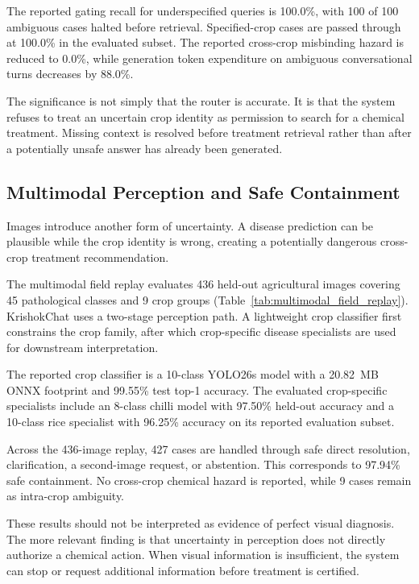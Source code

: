 \documentclass[a4paper,fleqn]{cas-dc}
\begin{document}
The reported gating recall for underspecified queries is 100.0\%, with 100 of 100 ambiguous cases halted before retrieval. Specified-crop cases are passed through at 100.0\% in the evaluated subset. The reported cross-crop misbinding hazard is reduced to 0.0\%, while generation token expenditure on ambiguous conversational turns decreases by 88.0\%.

The significance is not simply that the router is accurate. It is that the system refuses to treat an uncertain crop identity as permission to search for a chemical treatment. Missing context is resolved before treatment retrieval rather than after a potentially unsafe answer has already been generated.

\subsection{Multimodal Perception and Safe Containment}

Images introduce another form of uncertainty. A disease prediction can be plausible while the crop identity is wrong, creating a potentially dangerous cross-crop treatment recommendation.

The multimodal field replay evaluates 436 held-out agricultural images covering 45 pathological classes and 9 crop groups (Table~\ref{tab:multimodal_field_replay}). KrishokChat uses a two-stage perception path. A lightweight crop classifier first constrains the crop family, after which crop-specific disease specialists are used for downstream interpretation.

The reported crop classifier is a 10-class YOLO26s model with a 20.82~MB ONNX footprint and 99.55\% test top-1 accuracy. The evaluated crop-specific specialists include an 8-class chilli model with 97.50\% held-out accuracy and a 10-class rice specialist with 96.25\% accuracy on its reported evaluation subset.

Across the 436-image replay, 427 cases are handled through safe direct resolution, clarification, a second-image request, or abstention. This corresponds to 97.94\% safe containment. No cross-crop chemical hazard is reported, while 9 cases remain as intra-crop ambiguity.

These results should not be interpreted as evidence of perfect visual diagnosis. The more relevant finding is that uncertainty in perception does not directly authorize a chemical action. When visual information is insufficient, the system can stop or request additional information before treatment is certified.
\end{document}
